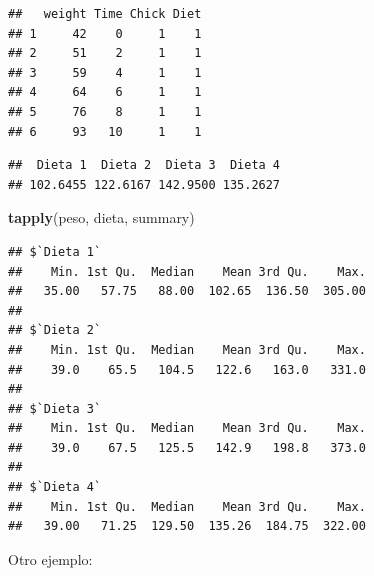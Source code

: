 \documentclass[]{book}
\newenvironment{Shaded}{\begin{snugshade}}{\end{snugshade}}
\newcommand{\KeywordTok}[1]{\textcolor[rgb]{0.13,0.29,0.53}{\textbf{#1}}}
\newcommand{\StringTok}[1]{\textcolor[rgb]{0.31,0.60,0.02}{#1}}
\newcommand{\CommentTok}[1]{\textcolor[rgb]{0.56,0.35,0.01}{\textit{#1}}}
\newcommand{\OperatorTok}[1]{\textcolor[rgb]{0.81,0.36,0.00}{\textbf{#1}}}
\newcommand{\NormalTok}[1]{#1}
\begin{document}
\begin{verbatim}
##   weight Time Chick Diet
## 1     42    0     1    1
## 2     51    2     1    1
## 3     59    4     1    1
## 4     64    6     1    1
## 5     76    8     1    1
## 6     93   10     1    1
\end{verbatim}

\begin{Shaded}
\end{Shaded}

\begin{verbatim}
##  Dieta 1  Dieta 2  Dieta 3  Dieta 4 
## 102.6455 122.6167 142.9500 135.2627
\end{verbatim}

\begin{Shaded}
\begin{Highlighting}[]
\KeywordTok{tapply}\NormalTok{(peso, dieta, summary)}
\end{Highlighting}
\end{Shaded}

\begin{verbatim}
## $`Dieta 1`
##    Min. 1st Qu.  Median    Mean 3rd Qu.    Max. 
##   35.00   57.75   88.00  102.65  136.50  305.00 
## 
## $`Dieta 2`
##    Min. 1st Qu.  Median    Mean 3rd Qu.    Max. 
##    39.0    65.5   104.5   122.6   163.0   331.0 
## 
## $`Dieta 3`
##    Min. 1st Qu.  Median    Mean 3rd Qu.    Max. 
##    39.0    67.5   125.5   142.9   198.8   373.0 
## 
## $`Dieta 4`
##    Min. 1st Qu.  Median    Mean 3rd Qu.    Max. 
##   39.00   71.25  129.50  135.26  184.75  322.00
\end{verbatim}

Otro ejemplo:
\end{document}
